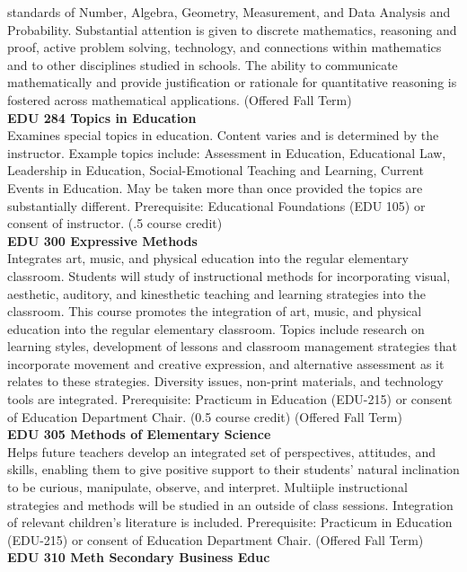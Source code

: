 \documentclass[
  letterpaper,
]{scrbook}
\begin{document}
standards of Number, Algebra, Geometry, Measurement, and Data Analysis
and Probability. Substantial attention is given to discrete mathematics,
reasoning and proof, active problem solving, technology, and connections
within mathematics and to other disciplines studied in schools. The
ability to communicate mathematically and provide justification or
rationale for quantitative reasoning is fostered across mathematical
applications. (Offered Fall Term)\\
\textbf{EDU 284 Topics in Education}\\
Examines special topics in education. Content varies and is determined
by the instructor. Example topics include: Assessment in Education,
Educational Law, Leadership in Education, Social-Emotional Teaching and
Learning, Current Events in Education. May be taken more than once
provided the topics are substantially different. Prerequisite:
Educational Foundations (EDU 105) or consent of instructor. (.5 course
credit)\\
\textbf{EDU 300 Expressive Methods}\\
Integrates art, music, and physical education into the regular
elementary classroom. Students will study of instructional methods for
incorporating visual, aesthetic, auditory, and kinesthetic teaching and
learning strategies into the classroom. This course promotes the
integration of art, music, and physical education into the regular
elementary classroom. Topics include research on learning styles,
development of lessons and classroom management strategies that
incorporate movement and creative expression, and alternative assessment
as it relates to these strategies. Diversity issues, non-print
materials, and technology tools are integrated. Prerequisite: Practicum
in Education (EDU-215) or consent of Education Department Chair. (0.5
course credit) (Offered Fall Term)\\
\textbf{EDU 305 Methods of Elementary Science}\\
Helps future teachers develop an integrated set of perspectives,
attitudes, and skills, enabling them to give positive support to their
students' natural inclination to be curious, manipulate, observe, and
interpret. Multiiple instructional strategies and methods will be
studied in an outside of class sessions. Integration of relevant
children's literature is included. Prerequisite: Practicum in Education
(EDU-215) or consent of Education Department Chair. (Offered Fall
Term)\\
\textbf{EDU 310 Meth Secondary Business Educ}\\
\end{document}
